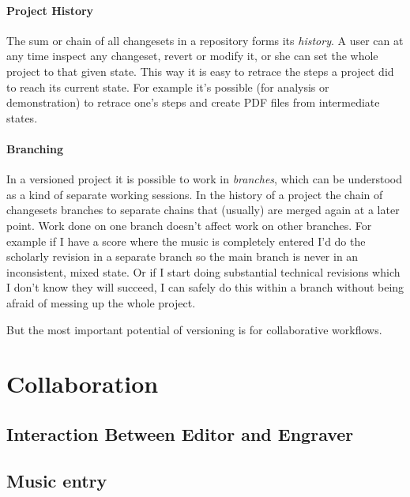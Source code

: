 \documentclass[11pt,a4paper]{article}
\begin{document}
\paragraph{Project History}
The sum or chain of all changesets in a repository forms its \emph{history}. A user can 
at any time inspect any changeset, revert or modify it, or she can set the whole project
to that given state. This way it is easy to retrace the steps a project did to reach
its current state. For example it's possible (for analysis or demonstration) to retrace
one's steps and create PDF files from intermediate states.

\paragraph{Branching}
In a versioned project it is possible to work in \emph{branches}, which can be
understood as a kind of separate working sessions. In the history of a project the chain
of changesets branches to separate chains that (usually) are merged again at a later point.
Work done on one branch doesn't affect work on other branches. For example if I have a
score where the music is completely entered I'd do the scholarly revision in a separate
branch so the main branch is never in an inconsistent, mixed state. Or if I start doing
substantial technical revisions which I don't know they will succeed, I can safely do
this within a branch without being afraid of messing up the whole project.

\medskip
But the most important potential of versioning is for collaborative workflows.

\section{Collaboration}

\subsection{Interaction Between Editor and Engraver}

\subsection{Music entry}
\end{document}
